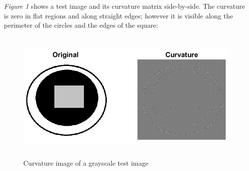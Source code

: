 \documentclass[a4paper,11pt]{article}
\begin{document}
\newpage

\emph{Figure 1} shows a test image and its curvature matrix side-by-side. The curvature is zero in flat regions and along straight edges; however it is visible along the perimeter of the circles and the edges of the square: 

\begin{figure}[!htb]
  \centering
  \includegraphics[width=14cm, height=6.5cm]{1.png}
  \caption{\small Curvature image of a grayscale test image}
\end{figure}
\end{document}

